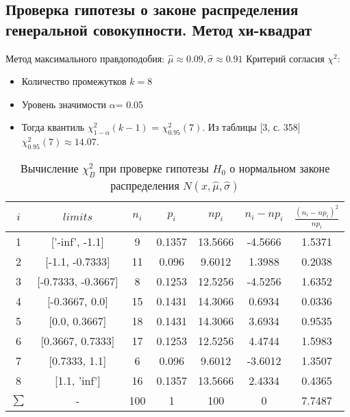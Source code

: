 \documentclass[../main.tex]{subfiles}
\begin{document}
		
    \subsection{Проверка гипотезы о законе распределения генеральной совокупности. Метод хи-квадрат}
    
    \noindent Метод максимального правдоподобия:
    \newline
    $\hat{\mu} \approx 0.09, \hat{\sigma} \approx 0.91$
    \newline Критерий согласия $\chi^{2}$:
    \begin{itemize}
        \item Количество промежутков $k = 8$
        \item Уровень значимости $\alpha$= 0.05
        \item Тогда квантиль $\chi^{2}_{1-\alpha}(k-1)$ = $\chi^{2}_{0.95}(7)$. Из таблицы [3, с. 358] $\chi^{2}_{0.95}(7) \approx 14.07$.
    \end{itemize}

    \newline
 
    \begin{table}[H]
    	\centering
    	\begin{tabular}{| c | c | c | c | c | c | c |}
    		\hline
    		$i$ & $limits$         &   $n_i$ &    $p_i$ &   $np_i$ &   $n_i - np_i$ &   $\frac{(n_i-np_i)^2}{np_i}$ \\
    		\hline
                 1 & ['-inf', -1.1]     &   9 & 0.1357 &  13.5666 & -4.5666 & 1.5371 \\
                 2 & [-1.1, -0.7333]    &  11 & 0.096  &   9.6012 &  1.3988 & 0.2038 \\
                 3 & [-0.7333, -0.3667] &   8 & 0.1253 &  12.5256 & -4.5256 & 1.6352 \\
                 4 & [-0.3667, 0.0]     &  15 & 0.1431 &  14.3066 &  0.6934 & 0.0336 \\
                 5 & [0.0, 0.3667]      &  18 & 0.1431 &  14.3066 &  3.6934 & 0.9535 \\
                 6 & [0.3667, 0.7333]   &  17 & 0.1253 &  12.5256 &  4.4744 & 1.5983 \\
                 7 & [0.7333, 1.1]      &   6 & 0.096  &   9.6012 & -3.6012 & 1.3507 \\
                 8 & [1.1, 'inf']       &  16 & 0.1357 &  13.5666 &  2.4334 & 0.4365 \\
                $\sum$ & -              & 100 & 1      & 100      & 0       & 7.7487 \\
    		\hline
    	\end{tabular}
    	\caption{ Вычисление $\chi^{2}_{B}$ при проверке гипотезы $H_{0}$ о нормальном законе распределения $N(x,\hat{\mu}, \hat{\sigma})$}
    	\label{tab:normal_chi_2}
    \end{table} 
    
\end{document}
